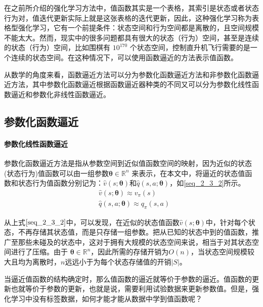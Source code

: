 在之前所介绍的强化学习方法中，值函数其实是一个表格，其索引是状态或者状态行为对，值迭代更新实际上就是这张表格的迭代更新，因此，这种强化学习称为表格型强化学习，它有一个前提条件：状态空间和行为空间都是离散的，且空间规模不能太大。然而，现实中的很多问题都具有很大的状态（行为）空间，甚至是连续的状态（行为）空间，比如围棋有 $10^{170}$  个状态空间，控制直升机飞行需要的是一个连续的状态空间。在这种情况下，可以使用函数逼近的方法表示值函数。

从数学的角度来看，函数逼近方法可以分为参数化函数逼近方法和非参数化函数逼近方法，其中参数化函数逼近根据函数逼近器种类的不同又可以分为参数化线性函数逼近和参数化非线性函数逼近。

\subsection{参数化函数逼近}

\paragraph{参数化线性函数逼近}
参数化函数逼近方法是指从参数空间到近似值函数空间的映射，因为近似的状态(状态行为)值函数可以由一组参数$\bm{\theta}\in \mathbb{R}^{n} $ 来表示，在本文中，将逼近的状态值函数和状态行为值函数分别记为：$\hat{v}(s;\bm{\theta})$和$\hat{q}(s,a;\bm{\theta})$，如\eqref{seq_2_3_2}所示。
\begin{equation}
\label{seq_2_3_2}
\begin{aligned}
&\hat{v}(s;\bm{\theta})\approx v_{\pi}(s)\\
&\hat{q}(s,a;\bm{\theta})\approx q_{\pi}(s,a)
\end{aligned}
\end{equation}

从上式$\eqref{seq_2_3_2}$中，可以发现，在近似的状态值函数$\hat{v}(s;\bm{\theta})$中，针对每个状态，不再存储其状态值，而是只存储一组参数。把从已知的状态中到的值函数，推广至那些未碰及的状态中，这对于拥有大规模的状态空间来说，相当于对其状态空间进行了压缩。由于 $\bm{\theta}\in \mathbb{R}^{n}$，因此所需的存储开销为$O(n)$，当状态空间规模较大且均为离散时，$n$远远小于为每个状态存储值的开销$|S|$。

当逼近值函数的结构确定时，那么值函数的逼近就等价于参数的逼近。值函数的更新也就等价于参数的更新，也就是说，需要利用试验数据来更新参数值。但是，强化学习中没有标签数据，如何才能才能从数据中学到值函数呢？

